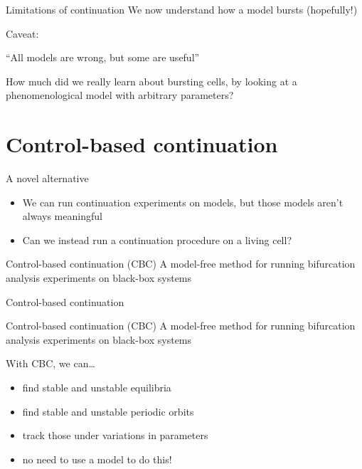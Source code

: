 \documentclass[presentation]{beamer}
\begin{document}
\begin{frame}[label={sec:org45df36e}]{Limitations of continuation}
We now understand how a model bursts (hopefully!)

Caveat: 
\vfill
\begin{exampleblock}{}
  {\large ``All models are wrong, but some are useful''}
  \vskip5mm
  \hspace*{}
\end{exampleblock}
\vfill

How much did we really learn about bursting cells, by looking at a phenomenological model with arbitrary parameters?
\end{frame}


\section{Control-based continuation}
\label{sec:orge3a9fdc}
\begin{frame}[label={sec:orgd6bd551}]{A novel alternative}
\begin{itemize}
\item We can run continuation experiments on models, but those models aren't always meaningful
\item Can we instead run a continuation procedure on a living cell?
\end{itemize}

\begin{block}{Control-based continuation (CBC)}
A model-free method for running bifurcation analysis experiments on black-box systems
\end{block}
\end{frame}

\begin{frame}[label={sec:org2e1e6de}]{Control-based continuation}
\begin{block}{Control-based continuation (CBC)}
    A model-free method for running bifurcation analysis experiments on black-box systems
\end{block}

With CBC, we can\ldots{}
\begin{itemize}[<+->]
\item find stable and unstable equilibria
\item find stable and unstable periodic orbits
\item track those under variations in parameters
\item no need to use a model to do this!
\end{itemize}
\end{frame}
\end{document}
